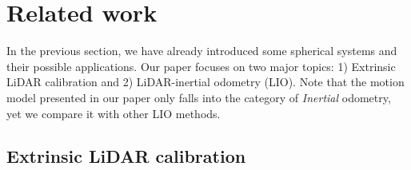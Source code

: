 \section{Related work}

In the previous section, we have already introduced some spherical systems and their possible applications.
Our paper focuses on two major topics: 1) Extrinsic LiDAR calibration and 2) LiDAR-inertial odometry (LIO).
Note that the motion model presented in our paper only falls into the category of \textit{Inertial} odometry, yet we compare it with other LIO methods.
 
\subsection{Extrinsic LiDAR calibration}

